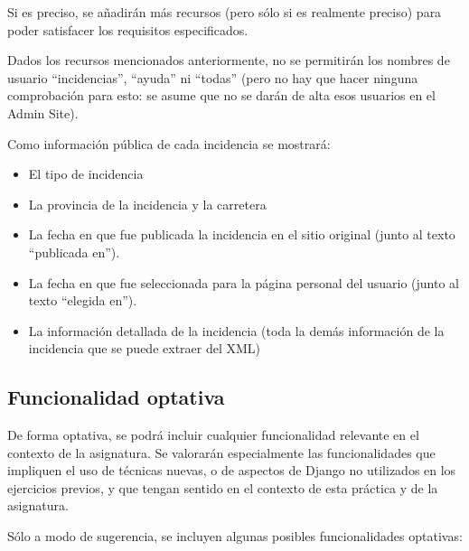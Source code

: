 Si es preciso, se añadirán más recursos (pero sólo si es realmente preciso) para poder satisfacer los requisitos especificados.

Dados los recursos mencionados anteriormente, no se permitirán los nombres de usuario ``incidencias'', ``ayuda'' ni ``todas'' (pero no hay que hacer ninguna comprobación para esto: se asume que no se darán de alta esos usuarios en el Admin Site).


Como información pública de cada incidencia se mostrará:
\begin{itemize}
  \item El tipo de incidencia
  \item La provincia de la incidencia y la carretera
  \item La fecha en que fue publicada la incidencia en el sitio original (junto al texto ``publicada en'').
  \item La fecha en que fue seleccionada para la página personal del usuario (junto al texto ``elegida en'').
  \item La información detallada de la incidencia (toda la demás información de la incidencia que se puede extraer del XML)
\end{itemize}



\subsection{Funcionalidad optativa}

De forma optativa, se podrá incluir cualquier funcionalidad relevante en el contexto de la asignatura. Se valorarán especialmente las funcionalidades que impliquen el uso de técnicas nuevas, o de aspectos de Django no utilizados en los ejercicios previos, y que tengan sentido en el contexto de esta práctica y de la asignatura.

Sólo a modo de sugerencia, se incluyen algunas posibles funcionalidades optativas:

